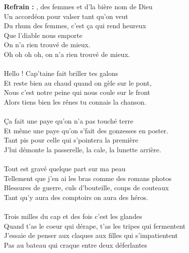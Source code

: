 
\textbf{Refrain :}
, des femmes et d'la bière nom de Dieu
\\Un accordéon pour valser tant qu'on veut
\\Du rhum des femmes, c'est ça qui rend heureux
\\Que l'diable nous emporte
\\On n'a rien trouvé de mieux.
\\Oh oh oh oh, on n'a rien trouvé de mieux.
\\\\Hello ! Cap'taine fait briller tes galons
\\Et reste bien au chaud quand on gèle sur le pont,
\\Nous c'est notre peine qui nous coule sur le front
\\Alors tiens bien les rênes tu connais la chanson.
\\\\Ça fait une paye qu'on n'a pas touché terre
\\Et même une paye qu'on s'fait des gonzesses en poster.
\\Tant pis pour celle qui s'pointera la première
\\J'lui démonte la passerelle, la cale, la lunette arrière.
\\\\Tout est gravé quelque part sur ma peau
\\Tellement que j'en ai les bras comme des romans photos
\\Blessures de guerre, culs d'bouteille, coups de couteaux
\\Tant qu'y aura des comptoirs on aura des héros.
\\\\Trois milles du cap et des fois c'est les glandes
\\Quand t'as le coeur qui dérape, t'as les tripes qui fermentent
\\J'essaie de penser aux claques aux filles qui s'impatientent
\\Pas au bateau qui craque entre deux déferlantes
\\

\breakpage